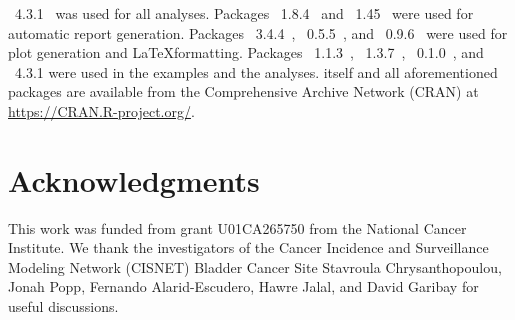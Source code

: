 \documentclass[article,nojss]{jss}\usepackage[]{graphicx}\usepackage[]{xcolor}
\begin{document}
~4.3.1~\citep{R-program}
was used for all analyses.
Packages
~{1.8.4}~\citep{xtable-package} and
~{1.45}~\citep{knitr-package}
were used for automatic report generation. Packages
~{3.4.4}~\citep{ggplot2-package},
~{0.5.5}~\citep{ggridges-package}, and
~{0.9.6}~\citep{latex2exp-package}
were used for plot generation and \LaTeX formatting.
Packages
~{1.1.3}~\citep{bench-package},
~{1.3.7}~\citep{rstream-package},
~{0.1.0}~\citep{otinference-package}, and
~{4.3.1}
were used in the examples and the analyses.
%
 itself
and all aforementioned packages are available from the Comprehensive
 Archive Network (CRAN) at
\url{https://CRAN.R-project.org/}.


\section*{Acknowledgments}
This work was funded from grant U01CA265750  from the National Cancer Institute.
We thank the investigators of the Cancer Incidence and Surveillance Modeling Network (CISNET)
Bladder Cancer Site Stavroula Chrysanthopoulou, Jonah Popp, Fernando Alarid-Escudero,
Hawre Jalal, and David Garibay for useful discussions.





\end{document}
